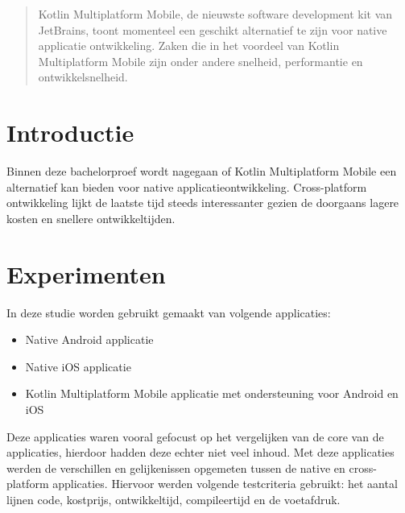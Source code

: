 \documentclass[a0,portrait]{a0poster}
\begin{document}
\begin{multicols}{2} %


\color{HoGentAccent1} %

\begin{abstract}
Kotlin Multiplatform Mobile, de nieuwste software development kit van JetBrains, toont momenteel een geschikt alternatief te zijn voor native applicatie ontwikkeling. Zaken die in het voordeel van Kotlin Multiplatform Mobile zijn onder andere snelheid, performantie en ontwikkelsnelheid.
\end{abstract}

\color{HoGentAccent1} 
\section*{Introductie}
\color{black}
\color{black}

Binnen deze bachelorproef wordt nagegaan of Kotlin Multiplatform Mobile een alternatief kan bieden voor native applicatieontwikkeling. Cross-platform ontwikkeling lijkt de laatste tijd steeds interessanter gezien de doorgaans lagere kosten en snellere ontwikkeltijden. 

\color{Black} %
\color{HoGentAccent1} 
\section*{Experimenten}
\color{black}
 In deze studie worden gebruikt gemaakt van volgende applicaties:
 \begin{itemize}
     \item Native Android applicatie
     \item Native iOS applicatie
     \item Kotlin Multiplatform Mobile applicatie met ondersteuning voor Android en iOS
 \end{itemize}
Deze applicaties waren vooral gefocust op het vergelijken van de core van de applicaties, hierdoor hadden deze echter niet veel inhoud. Met deze applicaties werden de verschillen en gelijkenissen opgemeten tussen de native en cross-platform applicaties. Hiervoor werden volgende testcriteria gebruikt: het aantal lijnen code, kostprijs, ontwikkeltijd, compileertijd en de voetafdruk.


\end{multicols}
\end{document}
